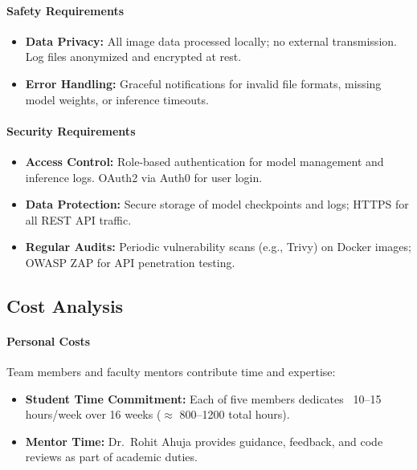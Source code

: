 \paragraph{Safety Requirements}
\begin{itemize}[leftmargin=*]
    \item \textbf{Data Privacy:} All image data processed locally; no external transmission. Log files anonymized and encrypted at rest.
    \item \textbf{Error Handling:} Graceful notifications for invalid file formats, missing model weights, or inference timeouts.
\end{itemize}

\paragraph{Security Requirements}
\begin{itemize}[leftmargin=*]
    \item \textbf{Access Control:} Role-based authentication for model management and inference logs. OAuth2 via Auth0 for user login.
    \item \textbf{Data Protection:} Secure storage of model checkpoints and logs; HTTPS for all REST API traffic.
    \item \textbf{Regular Audits:} Periodic vulnerability scans (e.g., Trivy) on Docker images; OWASP ZAP for API penetration testing.
\end{itemize}

\subsection{Cost Analysis}

\paragraph{Personal Costs}
Team members and faculty mentors contribute time and expertise:
\begin{itemize}[leftmargin=*]
    \item \textbf{Student Time Commitment:} Each of five members dedicates ~10–15 hours/week over 16 weeks (\(\approx\) 800–1200 total hours).
    \item \textbf{Mentor Time:} Dr.\ Rohit Ahuja provides guidance, feedback, and code reviews as part of academic duties.
\end{itemize}

